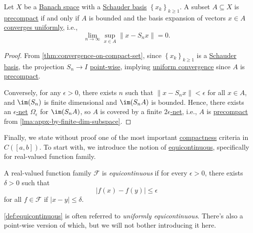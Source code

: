 \begin{corollary}
	Let \(X\) be a \hyperref[def:Banach-space]{Banach space} with a \hyperref[def:Schauder-basis]{Schauder basis} \(\left\{ x_k \right\}_{k \geq 1} \). A subset \(A \subseteq X\) is \hyperref[def:precompact]{precompact} if and only if \(A\) is bounded and the basis expansion of vectors \(x\in A\) \hyperref[def:uniformly-convergence]{converges uniformly}, i.e.,
	\[
		\lim_{n \to \infty} \sup _{x\in A} \left\lVert x - S_n x\right\rVert = 0.
	\]
\end{corollary}
\begin{proof}
	From \autoref{thm:convergence-on-compact-set}, since \(\left\{ x_k \right\} _{k\geq 1}\) is a \hyperref[def:Schauder-basis]{Schauder basis}, the projection \(S_n \to I\) \hyperref[def:point-wise-convergence]{point-wise}, implying \hyperref[def:uniformly-convergence]{uniform convergence} since \(A\) is \hyperref[def:precompact]{precompact}.

	Conversely, for any \(\epsilon > 0\), there exists \(n\) such that \(\left\lVert x - S_n x\right\rVert < \epsilon \) for all \(x\in A\), and \(\im (S_n)\)  is finite dimensional and \(\im(S_n A)\) is bounded. Hence, there exists an \hyperref[def:eps-net]{\(\epsilon \)-net} \(\Omega _\epsilon \) for \(\im(S_n A)\), so \(A\) is covered by a finite \hyperref[def:eps-net]{\(2\epsilon \)-net}, i.e., \(A\) is \hyperref[def:precompact]{precompact} from \autoref{lma:appx-by-finite-dim-subspace}.
\end{proof}

Finally, we state without proof one of the most important \hyperref[def:compact]{compactness} criteria in \(C([a, b])\). To start with, we introduce the notion of \hyperref[def:equicontinuous]{equicontinuous}, specifically for real-valued function family.

\begin{definition}[Equicontinuous]\label{def:equicontinuous}
	A real-valued function family \(\mathcal{F} \) is \emph{equicontinuous} if for every \(\epsilon > 0\), there exists \(\delta > 0\) such that
	\[
		\vert f(x) - f(y) \vert \leq \epsilon
	\]
	for all \(f\in \mathcal{F} \) if \(\vert x - y \vert \leq \delta \).
\end{definition}

\begin{remark}
	\autoref{def:equicontinuous} is often referred to \emph{uniformly equicontinuous}. There's also a point-wise version of which, but we will not bother introducing it here.
\end{remark}

